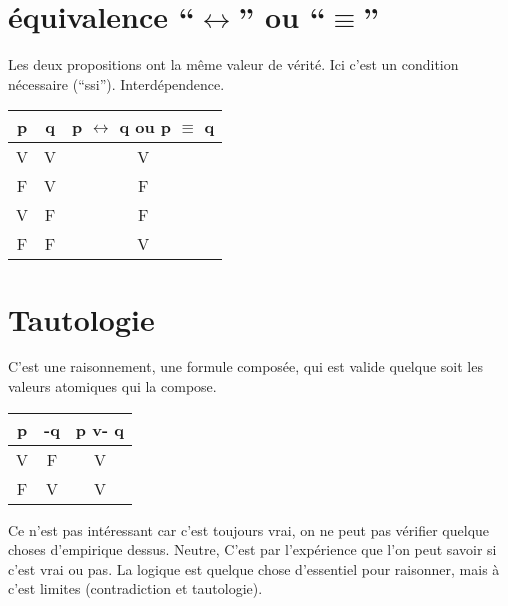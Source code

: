 \documentclass[11pt,a4paper]{article} %
\begin{document}
\section{équivalence ``$\leftrightarrow$'' ou ``$\equiv$''}
Les deux propositions ont la même valeur de vérité. Ici c'est un condition nécessaire (``ssi''). Interdépendence.
\begin{center}
	\begin{tabular}{|c|c||c|}
		\hline
		p&q&p $\leftrightarrow$ q ou p $\equiv$ q\\
		\hline
		V&V&V\\
		\hline
		F&V&F\\
		\hline
		V&F&F\\
		\hline
		F&F&V\\
		\hline
	\end{tabular}
\end{center}
\section{Tautologie}
C'est une raisonnement, une formule composée, qui est valide quelque soit les valeurs atomiques qui la compose.
\begin{center}
	\begin{tabular}{|c|c||c|}
		\hline
		p&-q&p v- q\\
		\hline
		V&F&V\\
		\hline
		F&V&V\\
		\hline
	\end{tabular}
\end{center}
Ce n'est pas intéressant car c'est toujours vrai, on ne peut pas vérifier quelque choses d'empirique dessus.
Neutre, C'est par l'expérience que l'on peut savoir si c'est vrai ou pas. La logique est quelque chose d'essentiel pour raisonner, mais à c'est limites (contradiction et tautologie).
\end{document}
